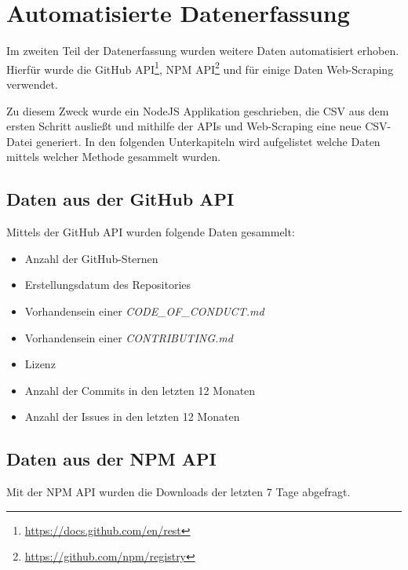 \section{Automatisierte Datenerfassung}\label{sec:automatisierte_datenerfassung}


Im zweiten Teil der Datenerfassung wurden weitere Daten automatisiert erhoben. Hierfür wurde die
GitHub API\footnote{\url{https://docs.github.com/en/rest}}, NPM
API\footnote{\url{https://github.com/npm/registry}} und für einige Daten Web-Scraping
verwendet.

Zu diesem Zweck wurde ein NodeJS Applikation geschrieben, die CSV aus dem ersten Schritt ausließt und
mithilfe der APIs und Web-Scraping eine neue CSV-Datei generiert. In den folgenden Unterkapiteln wird
aufgelistet welche Daten mittels welcher Methode gesammelt wurden.


\subsection{Daten aus der GitHub API}
Mittels der GitHub API wurden folgende Daten gesammelt:

\begin{itemize}[noitemsep]
    \item Anzahl der GitHub-Sternen
    \item Erstellungsdatum des Repositories
    \item Vorhandensein einer \textit{CODE\_OF\_CONDUCT.md}
    \item Vorhandensein einer \textit{CONTRIBUTING.md}
    \item Lizenz
    \item Anzahl der Commits in den letzten 12 Monaten
    \item Anzahl der Issues in den letzten 12 Monaten
\end{itemize}


\subsection{Daten aus der NPM API}
Mit der NPM API wurden die Downloads der letzten 7 Tage abgefragt.

